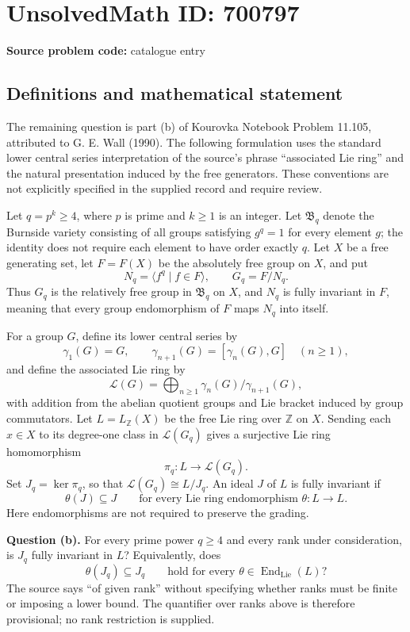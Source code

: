 \documentclass[11pt]{article}
\newcommand{\Z}{\mathbb{Z}}
\begin{document}
\section*{UnsolvedMath ID: 700797}
\textbf{Source problem code:} catalogue entry
\subsection{Definitions and mathematical statement}
The remaining question is part (b) of Kourovka Notebook Problem 11.105, attributed to G. E. Wall (1990). The following formulation uses the standard lower central series interpretation of the source's phrase ``associated Lie ring'' and the natural presentation induced by the free generators. These conventions are not explicitly specified in the supplied record and require review.

Let \(q=p^k\geq 4\), where \(p\) is prime and \(k\geq 1\) is an integer. Let \(\mathfrak B_q\) denote the Burnside variety consisting of all groups satisfying \(g^q=1\) for every element \(g\); the identity does not require each element to have order exactly \(q\). Let \(X\) be a free generating set, let \(F=F(X)\) be the absolutely free group on \(X\), and put
\[
N_q=\langle f^q\mid f\in F\rangle,\qquad G_q=F/N_q.
\]
Thus \(G_q\) is the relatively free group in \(\mathfrak B_q\) on \(X\), and \(N_q\) is fully invariant in \(F\), meaning that every group endomorphism of \(F\) maps \(N_q\) into itself.

For a group \(G\), define its lower central series by
\[
\gamma_1(G)=G,\qquad \gamma_{n+1}(G)=[\gamma_n(G),G]\quad(n\geq 1),
\]
and define the associated Lie ring by
\[
\mathcal L(G)=\bigoplus_{n\geq 1}\gamma_n(G)/\gamma_{n+1}(G),
\]
with addition from the abelian quotient groups and Lie bracket induced by group commutators. Let \(L=L_{\Z}(X)\) be the free Lie ring over \(\Z\) on \(X\). Sending each \(x\in X\) to its degree-one class in \(\mathcal L(G_q)\) gives a surjective Lie ring homomorphism
\[
\pi_q:L\longrightarrow\mathcal L(G_q).
\]
Set \(J_q=\ker\pi_q\), so that \(\mathcal L(G_q)\cong L/J_q\). An ideal \(J\) of \(L\) is fully invariant if
\[
\theta(J)\subseteq J\qquad\text{for every Lie ring endomorphism }\theta:L\to L.
\]
Here endomorphisms are not required to preserve the grading.

\textbf{Question (b).} For every prime power \(q\geq 4\) and every rank under consideration, is \(J_q\) fully invariant in \(L\)? Equivalently, does
\[
\theta(J_q)\subseteq J_q
\qquad\text{hold for every }\theta\in\operatorname{End}_{\mathrm{Lie}}(L)?
\]
The source says ``of given rank'' without specifying whether ranks must be finite or imposing a lower bound. The quantifier over ranks above is therefore provisional; no rank restriction is supplied.
\end{document}
